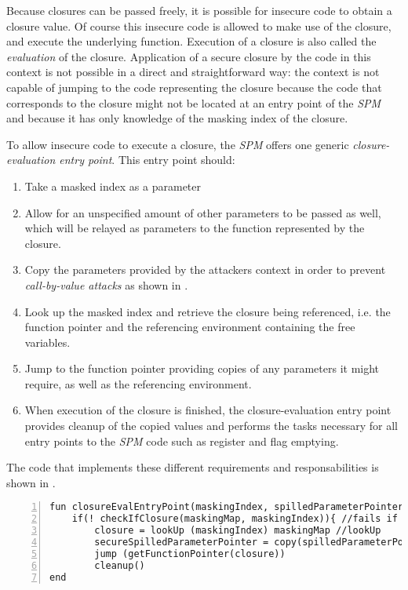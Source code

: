 \documentclass[10pt,a4paper,master=cws, masteroption=ai,english,inputenc=utf8]{kulemt}
\begin{document}
Because closures can be passed freely, it is possible for insecure code to obtain a closure value.
Of course this insecure code is allowed to make use of the closure, and execute the underlying function.
Execution of a closure is also called the \emph{evaluation} of the closure.
Application of a secure closure by the code in this context is not possible in a direct and straightforward way: the context is not capable of jumping to the code representing the closure because the code that corresponds to the closure might not be located at an entry point of the \emph{SPM} and because it has only knowledge of the masking index of the closure.

To allow insecure code to execute a closure, the \emph{SPM} offers one generic \emph{closure-evaluation entry point}. This entry point should:

\begin{enumerate}
\item Take a masked index as a parameter
\item Allow for an unspecified amount of other parameters to be passed as well, which will be relayed as parameters to the function represented by the closure.
\item Copy the parameters provided by the attackers context in order to prevent \emph{call-by-value attacks} as shown in .
\item Look up the masked index and retrieve the closure being referenced, i.e. the function pointer and the referencing environment containing the free variables.
\item Jump to the function pointer providing copies of any parameters it might require, as well as the referencing environment.
\item When execution of the closure is finished, the closure-evaluation entry point provides cleanup of the copied values and performs the tasks necessary for all entry points to the \emph{SPM} code such as register and flag emptying.
\end{enumerate}

The code that implements these different requirements and responsabilities is shown in .

\begin{lstlisting}[frame=single,numbers=left, language={[x86masm]Assembler}, caption=The generic closure-evaluation entry point.,
label=llvm:EvalEntryPoint]
fun closureEvalEntryPoint(maskingIndex, spilledParameterPointer)
    if(! checkIfClosure(maskingMap, maskingIndex)){ //fails if the index does not exist or does not reference a closure.
        closure = lookUp (maskingIndex) maskingMap //lookUp
        secureSpilledParameterPointer = copy(spilledParameterPointer)
        jump (getFunctionPointer(closure))
        cleanup()
end 
\end{lstlisting}
\end{document}
